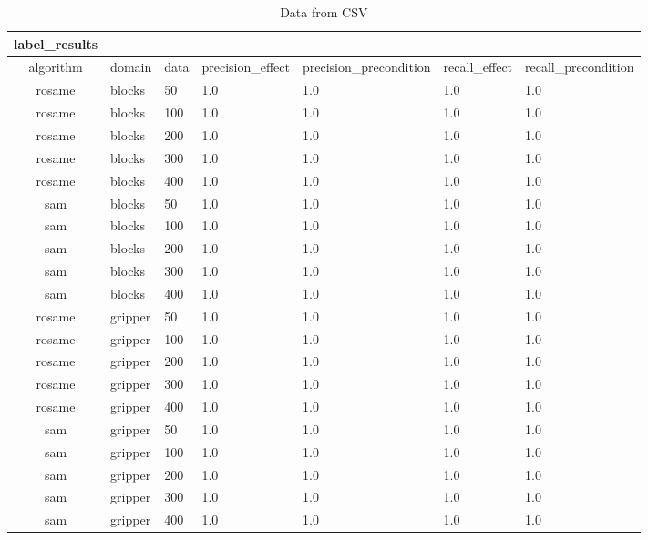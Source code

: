 \begin{table}[ht]
\centering
\begin{tabular}{c}
\hline
label_results \\ \hline
algorithm & domain & data & precision_effect & precision_precondition & recall_effect & recall_precondition \\ \hline
rosame & blocks & 50 & 1.0 & 1.0 & 1.0 & 1.0 \\ \hline
rosame & blocks & 100 & 1.0 & 1.0 & 1.0 & 1.0 \\ \hline
rosame & blocks & 200 & 1.0 & 1.0 & 1.0 & 1.0 \\ \hline
rosame & blocks & 300 & 1.0 & 1.0 & 1.0 & 1.0 \\ \hline
rosame & blocks & 400 & 1.0 & 1.0 & 1.0 & 1.0 \\ \hline
sam & blocks & 50 & 1.0 & 1.0 & 1.0 & 1.0 \\ \hline
sam & blocks & 100 & 1.0 & 1.0 & 1.0 & 1.0 \\ \hline
sam & blocks & 200 & 1.0 & 1.0 & 1.0 & 1.0 \\ \hline
sam & blocks & 300 & 1.0 & 1.0 & 1.0 & 1.0 \\ \hline
sam & blocks & 400 & 1.0 & 1.0 & 1.0 & 1.0 \\ \hline
rosame & gripper & 50 & 1.0 & 1.0 & 1.0 & 1.0 \\ \hline
rosame & gripper & 100 & 1.0 & 1.0 & 1.0 & 1.0 \\ \hline
rosame & gripper & 200 & 1.0 & 1.0 & 1.0 & 1.0 \\ \hline
rosame & gripper & 300 & 1.0 & 1.0 & 1.0 & 1.0 \\ \hline
rosame & gripper & 400 & 1.0 & 1.0 & 1.0 & 1.0 \\ \hline
sam & gripper & 50 & 1.0 & 1.0 & 1.0 & 1.0 \\ \hline
sam & gripper & 100 & 1.0 & 1.0 & 1.0 & 1.0 \\ \hline
sam & gripper & 200 & 1.0 & 1.0 & 1.0 & 1.0 \\ \hline
sam & gripper & 300 & 1.0 & 1.0 & 1.0 & 1.0 \\ \hline
sam & gripper & 400 & 1.0 & 1.0 & 1.0 & 1.0 \\ \hline
\end{tabular}
\caption{Data from CSV}
\label{tab:csv_data}
\end{table}
